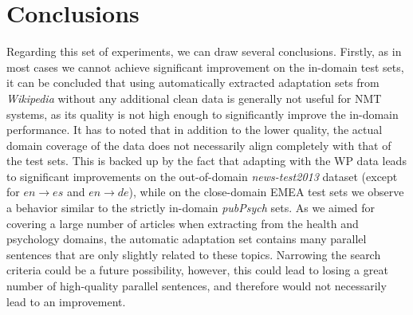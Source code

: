\documentclass[a4paper,11pt]{article}
\begin{document}
\section{Conclusions}
\label{s:conclusions}

Regarding this set of experiments, we can draw several conclusions. Firstly, as in most cases we cannot achieve significant improvement on the in-domain test sets, it can be concluded that using automatically extracted adaptation sets from \textit{Wikipedia} without any additional clean data is generally not useful for NMT systems, as its quality is not high enough to significantly improve the in-domain performance. It has to noted that in addition to the lower quality, the actual domain coverage of the data does not necessarily align completely with that of the test sets. This is backed up by the fact that adapting with the WP data leads to significant improvements on the out-of-domain \textit{news-test2013} dataset (except for $en\rightarrow es$ and $en\rightarrow de$), while on the close-domain EMEA test sets we observe a behavior similar to the strictly in-domain \textit{pubPsych} sets. As we aimed for covering a large number of articles when extracting from the health and psychology domains, the automatic adaptation set contains many parallel sentences that are only slightly related to these topics. Narrowing the search criteria could be a future possibility, however, this could lead to losing a great number of high-quality parallel sentences, and therefore would not necessarily lead to an improvement.

%
%


\end{document}
